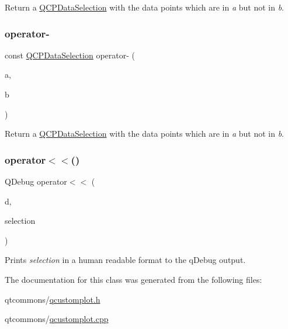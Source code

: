 Return a \mbox{\hyperlink{class_q_c_p_data_selection}{Q\+C\+P\+Data\+Selection}} with the data points which are in {\itshape a} but not in {\itshape b}. \mbox{\label{class_q_c_p_data_selection_ad62dd67b505c1fa9c02d1aafabcb9acf}} 
\subsubsection{\texorpdfstring{operator-\/}{operator-}\hspace{0.1cm}{\footnotesize\ttfamily [4/4]}}
{\footnotesize\ttfamily const \mbox{\hyperlink{class_q_c_p_data_selection}{Q\+C\+P\+Data\+Selection}} operator-\/ (\begin{DoxyParamCaption}\item[{const \mbox{\hyperlink{class_q_c_p_data_range}{Q\+C\+P\+Data\+Range}} \&}]{a,  }\item[{const \mbox{\hyperlink{class_q_c_p_data_range}{Q\+C\+P\+Data\+Range}} \&}]{b }\end{DoxyParamCaption})\hspace{0.3cm}{\ttfamily [friend]}}

Return a \mbox{\hyperlink{class_q_c_p_data_selection}{Q\+C\+P\+Data\+Selection}} with the data points which are in {\itshape a} but not in {\itshape b}. \mbox{\label{class_q_c_p_data_selection_aed65b8988afe6b03adeadf5edf663670}} 
\subsubsection{\texorpdfstring{operator$<$$<$()}{operator<<()}}
{\footnotesize\ttfamily Q\+Debug operator$<$$<$ (\begin{DoxyParamCaption}\item[{Q\+Debug}]{d,  }\item[{const \mbox{\hyperlink{class_q_c_p_data_selection}{Q\+C\+P\+Data\+Selection}} \&}]{selection }\end{DoxyParamCaption})\hspace{0.3cm}{\ttfamily [related]}}

Prints {\itshape selection} in a human readable format to the q\+Debug output. 

The documentation for this class was generated from the following files\+:\begin{DoxyCompactItemize}
\item 
qtcommons/\mbox{\hyperlink{qcustomplot_8h}{qcustomplot.\+h}}\item 
qtcommons/\mbox{\hyperlink{qcustomplot_8cpp}{qcustomplot.\+cpp}}\end{DoxyCompactItemize}

